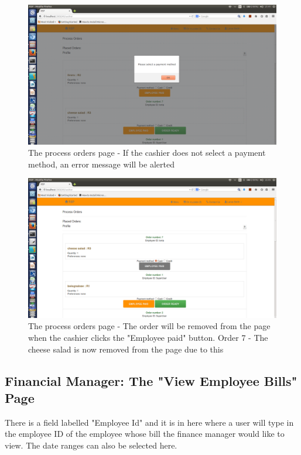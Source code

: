 \documentclass[a4paper,12pt]{report}
\begin{document}
\begin{figure}[H]
  \centering
    \includegraphics[width=1.0\textwidth]{screenshots/noPaymentMethSelected.png}
    \caption{The process orders page - If the cashier does not select a payment method, an error message will be alerted}
\end{figure}

\begin{figure}[H]
  \centering
    \includegraphics[width=1.0\textwidth]{screenshots/empPaid.png}
    \caption{The process orders page - The order will be removed from the page when the cashier clicks the "Employee paid" button. Order 7 - The cheese salad is now removed from the page due to this}
\end{figure}

\subsection{Financial Manager: The "View Employee Bills" Page}
There is a field labelled "Employee Id" and it is in here where a user will type in the employee ID of the employee whose bill the finance manager would like to view. The date ranges can also be selected here.
\end{document}
